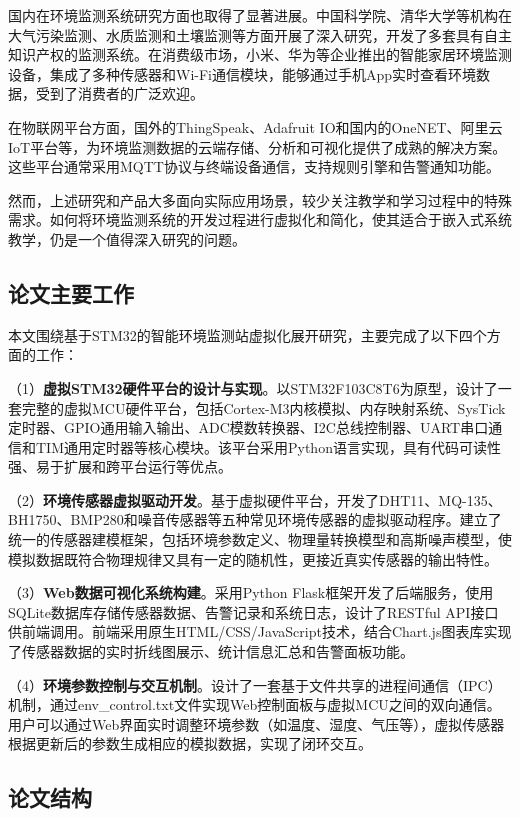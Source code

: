 \documentclass[12pt,a4paper]{ctexart}
\begin{document}
国内在环境监测系统研究方面也取得了显著进展。中国科学院、清华大学等机构在大气污染监测、水质监测和土壤监测等方面开展了深入研究，开发了多套具有自主知识产权的监测系统。在消费级市场，小米、华为等企业推出的智能家居环境监测设备，集成了多种传感器和Wi-Fi通信模块，能够通过手机App实时查看环境数据，受到了消费者的广泛欢迎。

在物联网平台方面，国外的ThingSpeak、Adafruit IO和国内的OneNET、阿里云IoT平台等，为环境监测数据的云端存储、分析和可视化提供了成熟的解决方案。这些平台通常采用MQTT协议与终端设备通信，支持规则引擎和告警通知功能。

然而，上述研究和产品大多面向实际应用场景，较少关注教学和学习过程中的特殊需求。如何将环境监测系统的开发过程进行虚拟化和简化，使其适合于嵌入式系统教学，仍是一个值得深入研究的问题。

\subsection{论文主要工作}

本文围绕基于STM32的智能环境监测站虚拟化展开研究，主要完成了以下四个方面的工作：

（1）\textbf{虚拟STM32硬件平台的设计与实现}。以STM32F103C8T6为原型，设计了一套完整的虚拟MCU硬件平台，包括Cortex-M3内核模拟、内存映射系统、SysTick定时器、GPIO通用输入输出、ADC模数转换器、I2C总线控制器、UART串口通信和TIM通用定时器等核心模块。该平台采用Python语言实现，具有代码可读性强、易于扩展和跨平台运行等优点。

（2）\textbf{环境传感器虚拟驱动开发}。基于虚拟硬件平台，开发了DHT11、MQ-135、BH1750、BMP280和噪音传感器等五种常见环境传感器的虚拟驱动程序。建立了统一的传感器建模框架，包括环境参数定义、物理量转换模型和高斯噪声模型，使模拟数据既符合物理规律又具有一定的随机性，更接近真实传感器的输出特性。

（3）\textbf{Web数据可视化系统构建}。采用Python Flask框架开发了后端服务，使用SQLite数据库存储传感器数据、告警记录和系统日志，设计了RESTful API接口供前端调用。前端采用原生HTML/CSS/JavaScript技术，结合Chart.js图表库实现了传感器数据的实时折线图展示、统计信息汇总和告警面板功能。

（4）\textbf{环境参数控制与交互机制}。设计了一套基于文件共享的进程间通信（IPC）机制，通过env\_control.txt文件实现Web控制面板与虚拟MCU之间的双向通信。用户可以通过Web界面实时调整环境参数（如温度、湿度、气压等），虚拟传感器根据更新后的参数生成相应的模拟数据，实现了闭环交互。

\subsection{论文结构}
\end{document}
